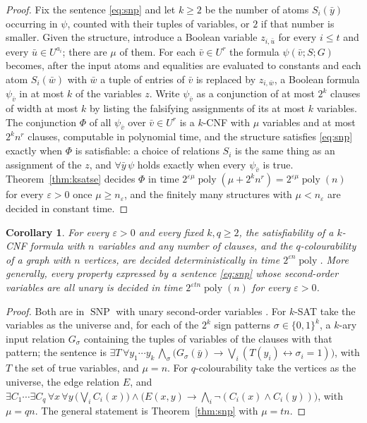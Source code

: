 \documentclass[11pt,reqno]{amsart}
\numberwithin{equation}{section}
\theoremstyle{plain}
\newtheorem{corollary}[theorem]{Corollary}
\theoremstyle{definition}
\theoremstyle{remark}
\DeclareMathOperator{\poly}{poly}
\DeclareMathOperator{\SNP}{SNP}
\begin{document}
\begin{proof}
Fix the sentence \eqref{eq:snp} and let $k\ge 2$ be the number of atoms
$S_i(\bar y)$ occurring in $\psi$, counted with their tuples of variables, or
$2$ if that number is smaller. Given
the structure, introduce a Boolean variable $z_{i,\bar u}$ for every $i\le t$
and every $\bar u\in U^{a_i}$; there are $\mu$ of them. For each
$\bar v\in U^{r}$ the formula $\psi(\bar v;S;G)$ becomes, after the input atoms
and equalities are evaluated to constants and each atom $S_i(\bar w)$ with
$\bar w$ a tuple of entries of $\bar v$ is replaced by $z_{i,\bar w}$, a Boolean
formula $\psi_{\bar v}$ in at most $k$ of the variables $z$. Write
$\psi_{\bar v}$ as a conjunction of at most $2^{k}$ clauses of width at most $k$
by listing the falsifying assignments of its at most $k$ variables. The
conjunction $\Phi$ of all $\psi_{\bar v}$ over $\bar v\in U^r$ is a $k$-CNF with
$\mu$ variables and at most $2^kn^r$ clauses, computable in polynomial time,
and the structure satisfies \eqref{eq:snp} exactly when $\Phi$ is satisfiable:
a choice of relations $S_i$ is the same thing as an assignment of the $z$, and
$\forall\bar y\,\psi$ holds exactly when every $\psi_{\bar v}$ is true.
Theorem~\ref{thm:ksatse} decides $\Phi$ in time
$2^{\varepsilon\mu}\poly(\mu+2^kn^r)=2^{\varepsilon\mu}\poly(n)$ for every
$\varepsilon>0$ once $\mu\ge n_\varepsilon$, and the finitely many structures
with $\mu<n_\varepsilon$ are decided in constant time.
\end{proof}

\begin{corollary}\label{cor:snpexamples}
For every $\varepsilon>0$ and every fixed $k,q\ge 2$, the satisfiability of a
$k$-CNF formula with $n$ variables and any number of clauses, and the
$q$-colourability of a graph with $n$ vertices, are decided deterministically in
time $2^{\varepsilon n}\poly$. More generally, every property expressed by a
sentence \eqref{eq:snp} whose second-order variables are all unary is decided in
time $2^{\varepsilon tn}\poly(n)$ for every $\varepsilon>0$.
\end{corollary}

\begin{proof}
Both are in $\SNP$ with unary second-order variables \cite{PY91,IPZ01}. For
$k$-SAT take the variables as the universe and, for each of the $2^k$ sign
patterns $\sigma\in\{0,1\}^k$, a $k$-ary input relation $G_\sigma$ containing
the tuples of variables of the clauses with that pattern; the sentence is
$\exists T\,\forall y_1\cdots y_k\,\bigwedge_\sigma\bigl(G_\sigma(\bar y)\to
\bigvee_{i}(T(y_i)\leftrightarrow\sigma_i=1)\bigr)$, with $T$ the set of true
variables, and $\mu=n$. For $q$-colourability take the vertices as the universe,
the edge relation $E$, and
$\exists C_1\cdots\exists C_q\,\forall x\,\forall y\,\bigl(\bigvee_i C_i(x)\bigr)
\wedge\bigl(E(x,y)\to\bigwedge_i\neg(C_i(x)\wedge C_i(y))\bigr)$, with $\mu=qn$.
The general statement is Theorem~\ref{thm:snp} with $\mu=tn$.
\end{proof}
\end{document}
